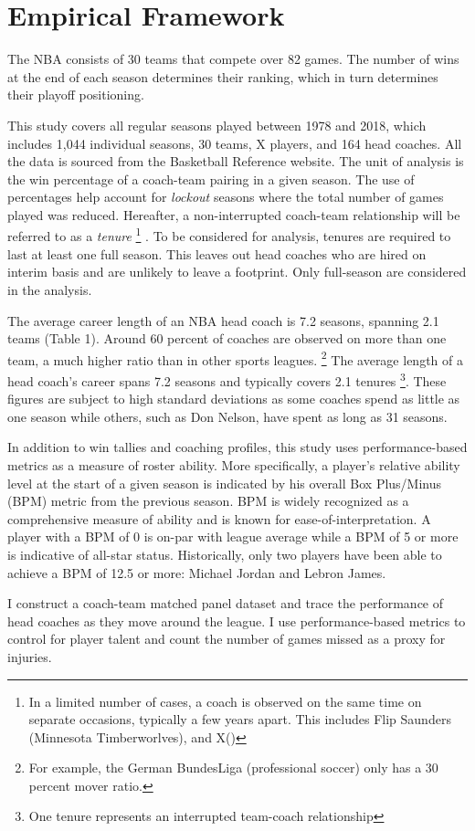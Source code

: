 \section{Empirical Framework}

The NBA consists of 30 teams that compete over 82 games. The number of wins at the end of each season determines their ranking, which in turn determines their playoff positioning. 

This study covers all regular seasons played between 1978 and 2018, which includes 1,044 individual seasons, 30 teams, X players, and 164 head coaches. All the data is sourced from the Basketball Reference website. The unit of analysis is the win percentage of a coach-team pairing in a given season. The use of percentages help account for \textit{lockout} seasons where the total number of games played was reduced. Hereafter, a non-interrupted coach-team relationship will be referred to as a \textit{tenure} \footnote{In a limited number of cases, a coach is observed on the same time on separate occasions, typically a few years apart. This includes Flip Saunders (Minnesota Timberworlves), and X()} . To be considered for analysis, tenures are required to last at least one full season. This leaves out head coaches who are hired on interim basis and are unlikely to leave a footprint. Only full-season are considered in the analysis.

The average career length of an NBA head coach is 7.2 seasons, spanning 2.1 teams (Table 1).  Around 60 percent of coaches are observed on more than one team, a much higher ratio than in other sports leagues. \footnote{For example, the German BundesLiga (professional soccer) only has a 30 percent mover ratio.} The average length of a head coach's career spans 7.2 seasons and typically covers 2.1 tenures \footnote{One tenure represents an interrupted team-coach relationship}. These figures are subject to high standard deviations as some coaches spend as little as one season while others, such as Don Nelson, have spent as long as 31 seasons.

In addition to win tallies and coaching profiles, this study uses performance-based metrics as a measure of roster ability. More specifically, a player's relative ability level at the start of a given season is indicated by his overall Box Plus/Minus (BPM) metric from the previous season. BPM is widely recognized as a comprehensive measure of ability and is known for ease-of-interpretation. A player with a BPM of 0 is on-par with league average while a BPM of 5 or more is indicative of all-star status. Historically, only two players have been able to achieve a BPM of 12.5 or more: Michael Jordan and Lebron James. 



I construct a coach-team matched panel dataset and trace the performance of head coaches as they move around the league. I use performance-based metrics to control for player talent and count the number of games missed as a proxy for injuries.
